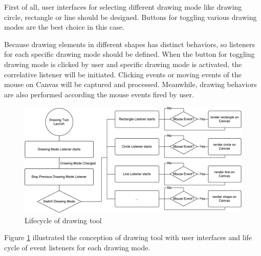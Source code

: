 First of all, user interfaces for selecting different drawing mode like drawing circle, rectangle or line should be designed. Buttons for toggling various drawing modes are the best choice in this case.

Because drawing elements in different shapes has distinct behaviors, so listeners for each specific drawing mode should be defined. When the button for toggling drawing mode is clicked by user and specific drawing mode is activated, the correlative listener will be initiated. Clicking events or moving events of the mouse on Canvas will be captured and processed. Meanwhile, drawing behaviors are also performed according the mouse events fired by user.

\begin{figure}[!htbp]
  \centering
    \includegraphics[width=1\textwidth]{Figures/concept-drawing-tool.pdf}
  \caption{Lifecycle of drawing tool}
  \label{fig:drawing-tool-concept}
\end{figure}

Figure \ref{fig:drawing-tool-concept} illustrated the conception of drawing tool with user interfaces and life cycle of event listeners for each drawing mode.
